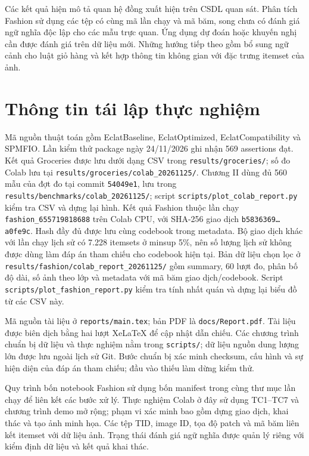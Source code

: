 \documentclass[conference,a4paper]{IEEEtran}
\begin{document}
Các kết quả hiện mô tả quan hệ đồng xuất hiện trên CSDL quan sát.
Phân tích Fashion sử dụng các tệp có cùng mã lần chạy và mã băm, song
chưa có đánh giá ngữ nghĩa độc lập cho các mẫu trực quan. Ứng dụng dự
đoán hoặc khuyến nghị cần được đánh giá trên dữ liệu mới. Những hướng
tiếp theo gồm bổ sung ngữ cảnh cho luật giỏ hàng và kết hợp thông tin
không gian với đặc trưng itemset của ảnh.

\appendices
\section{Thông tin tái lập thực nghiệm}
\label{sec:reproduction}
Mã nguồn thuật toán gồm EclatBaseline, EclatOptimized,
EclatCompatibility và SPMFIO. Lần kiểm thử package ngày 24/11/2026
ghi nhận 569 assertions đạt. Kết quả Groceries được lưu dưới dạng CSV
trong \texttt{results/groceries/}; số đo Colab lưu tại
\texttt{results/groceries/colab\_20261125/}. Chương II dùng đủ 560 mẫu
của đợt đo tại commit \texttt{54049e1}, lưu trong
\texttt{results/benchmarks/colab\_20261125/}; script
\texttt{scripts/plot\_colab\_report.py} kiểm tra CSV và dựng lại hình.
Kết quả Fashion thuộc lần chạy
\texttt{fashion\_655719818688} trên Colab CPU, với SHA-256 giao dịch
\texttt{b5836369\ldots a0fe9c}. Hash đầy đủ được lưu cùng codebook
trong metadata. Bộ giao dịch khác với lần chạy lịch sử có 7.228
itemsets ở minsup 5\%, nên số lượng lịch sử không được dùng làm đáp án
tham chiếu cho codebook hiện tại. Bản dữ liệu chọn lọc ở
\texttt{results/fashion/colab\_report\_20261125/} gồm summary, 60 lượt đo,
phân bố độ dài, số ảnh theo lớp và metadata với mã băm giao dịch/codebook.
Script \texttt{scripts/plot\_fashion\_report.py} kiểm tra tính nhất quán
và dựng lại biểu đồ từ các CSV này.

Mã nguồn tài liệu ở \texttt{reports/main.tex}; bản PDF là
\texttt{docs/Report.pdf}. Tài liệu được biên dịch bằng hai lượt XeLaTeX
để cập nhật dẫn chiếu. Các chương trình chuẩn bị dữ liệu và thực nghiệm
nằm trong \texttt{scripts/}; dữ liệu nguồn dung lượng lớn được lưu ngoài
lịch sử Git. Bước chuẩn bị xác minh checksum, cấu hình và sự hiện diện
của đáp án tham chiếu; đầu vào thiếu làm dừng kiểm thử.

Quy trình bốn notebook Fashion sử dụng bốn manifest trong cùng thư mục
lần chạy để liên kết các bước xử lý. Thực nghiệm Colab ở đây sử dụng
TC1--TC7 và chương trình demo mở rộng; phạm vi xác minh bao gồm dựng
giao dịch, khai thác và tạo ảnh minh họa. Các tệp TID, image ID, tọa độ
patch và mã băm liên kết itemset với dữ liệu ảnh. Trạng thái đánh giá
ngữ nghĩa được quản lý riêng với kiểm định dữ liệu và kết quả khai thác.
\end{document}
